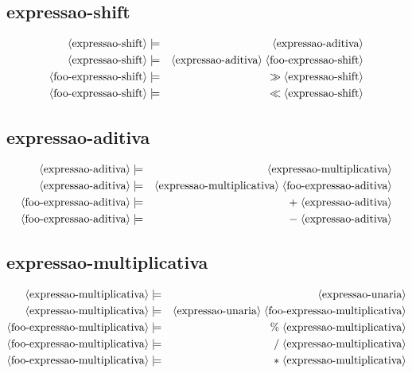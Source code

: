 \documentclass[12pt,a4papper]{article}
\newcommand{\pn}[1]{\langle \textnormal{#1} \rangle}
\newcommand{\pp}{\models}
\newcommand{\ww}{\;}
\newcommand{\sm}[1]{\textnormal{#1}}
\begin{document}
\begin{landscape}
        
\subsection{expressao-shift}
\begin{eqnarray}
        \pn{expressao-shift} &\pp& \pn{expressao-aditiva} \\
        \pn{expressao-shift} &\pp& \pn{expressao-aditiva} \ww \pn{foo-expressao-shift} \\
    \pn{foo-expressao-shift} &\pp& \sm{$\gg$} \ww \pn{expressao-shift} \\
    \pn{foo-expressao-shift} &\pp& \sm{$\ll$} \ww \pn{expressao-shift}
\end{eqnarray}

       
\subsection{expressao-aditiva}
\begin{eqnarray}
        \pn{expressao-aditiva} &\pp& \pn{expressao-multiplicativa}\\
        \pn{expressao-aditiva} &\pp& \pn{expressao-multiplicativa} \ww \pn{foo-expressao-aditiva} \\
    \pn{foo-expressao-aditiva} &\pp& \sm{$+$} \ww \pn{expressao-aditiva} \\
    \pn{foo-expressao-aditiva} &\pp& \sm{$-$} \ww \pn{expressao-aditiva}
\end{eqnarray}

\subsection{expressao-multiplicativa}
\begin{eqnarray}
        \pn{expressao-multiplicativa} &\pp& \pn{expressao-unaria} \\
        \pn{expressao-multiplicativa} &\pp& \pn{expressao-unaria} \ww \pn{foo-expressao-multiplicativa} \\
    \pn{foo-expressao-multiplicativa} &\pp& \sm{\%} \ww \pn{expressao-multiplicativa} \\
        \pn{foo-expressao-multiplicativa} &\pp& \sm{/} \ww \pn{expressao-multiplicativa} \\
        \pn{foo-expressao-multiplicativa} &\pp& \sm{$*$} \ww \pn{expressao-multiplicativa}
\end{eqnarray}




\end{landscape}
\end{document}
